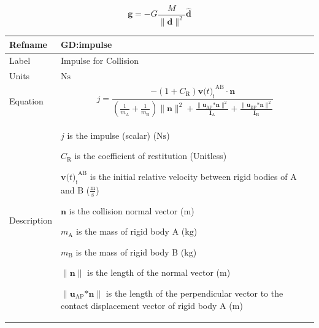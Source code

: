 \documentclass[12pt]{article}
\begin{document}
\begin{displaymath}
\symbf{g}=-G \frac{M}{{\|\symbf{d}\|^{2}}} \symbf{\hat{d}}
\end{displaymath}
\vspace{\baselineskip}
\noindent
\begin{minipage}{\textwidth}
\begin{tabular}{>{\raggedright}p{}>{\raggedright\arraybackslash}p{}}
\toprule \textbf{Refname} & \textbf{GD:impulse}
\label{GD:impulse}
\\ \midrule
Label & Impulse for Collision
        
\\ \midrule
Units & $\text{N}\text{s}$
        
\\ \midrule
Equation & \begin{displaymath}
           j=\frac{-\left(1+{C_{\text{R}}}\right) {{\symbf{v}\text{(}t\text{)}_{\text{i}}}^{\text{A}\text{B}}}\cdot{}\symbf{n}}{\left(\frac{1}{{m_{\text{A}}}}+\frac{1}{{m_{\text{B}}}}\right) \|\symbf{n}\|^{2}+\frac{\|{\symbf{u}_{\text{A}\text{P}}}\text{*}\symbf{n}\|^{2}}{{\symbf{I}_{\text{A}}}}+\frac{\|{\symbf{u}_{\text{B}\text{P}}}\text{*}\symbf{n}\|^{2}}{{\symbf{I}_{\text{B}}}}}
           \end{displaymath}
\\ \midrule
Description & \begin{symbDescription}
              \item{$j$ is the impulse (scalar) ($\text{N}\text{s}$)}
              \item{${C_{\text{R}}}$ is the coefficient of restitution (Unitless)}
              \item{${{\symbf{v}\text{(}t\text{)}_{\text{i}}}^{\text{A}\text{B}}}$ is the initial relative velocity between rigid bodies of A and B ($\frac{\text{m}}{\text{s}}$)}
              \item{$\symbf{n}$ is the collision normal vector (${\text{m}}$)}
              \item{${m_{\text{A}}}$ is the mass of rigid body A (${\text{kg}}$)}
              \item{${m_{\text{B}}}$ is the mass of rigid body B (${\text{kg}}$)}
              \item{$\|\symbf{n}\|$ is the length of the normal vector (${\text{m}}$)}
              \item{$\|{\symbf{u}_{\text{A}\text{P}}}\text{*}\symbf{n}\|$ is the length of the perpendicular vector to the contact displacement vector of rigid body A (${\text{m}}$)}

\end{symbDescription}
\end{tabular}
\end{minipage}
\end{document}
